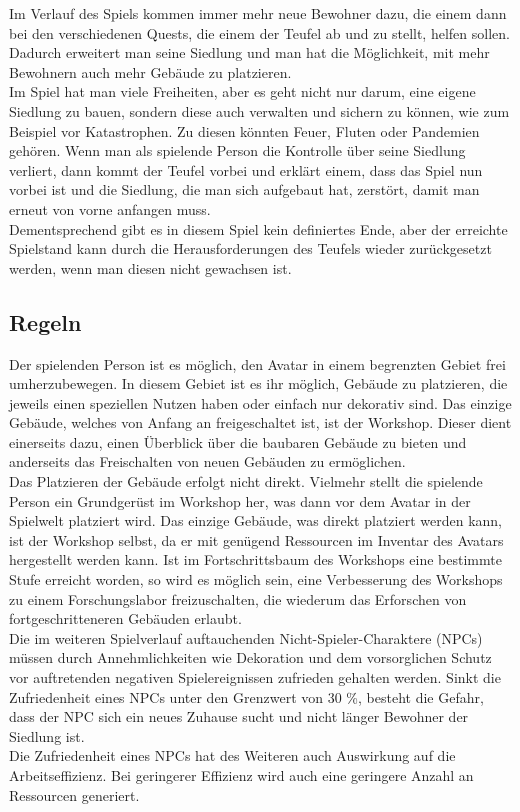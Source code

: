 \documentclass[paper=A4,pagesize=auto,12pt,headinclude=true,footinclude=true,BCOR=0mm,DIV=calc]{scrartcl}
\newcommand{\sectionspace}{
	\vspace{0.5cm}
}
\begin{document}
Im Verlauf des Spiels kommen immer mehr neue Bewohner dazu, die einem dann bei den verschiedenen Quests, die einem der Teufel ab und zu stellt, helfen sollen. Dadurch erweitert man seine Siedlung und man hat die Möglichkeit, mit mehr Bewohnern auch mehr Gebäude zu platzieren. \\
Im Spiel hat man viele Freiheiten, aber es geht nicht nur darum, eine eigene Siedlung zu bauen, sondern diese auch verwalten und sichern zu können, wie zum Beispiel vor Katastrophen. Zu diesen könnten Feuer, Fluten oder Pandemien gehören. Wenn man als spielende Person die Kontrolle über seine Siedlung verliert, dann kommt der Teufel vorbei und erklärt einem, dass das Spiel nun vorbei ist und die Siedlung, die man sich aufgebaut hat, zerstört, damit man erneut von vorne anfangen muss. \\
Dementsprechend gibt es in diesem Spiel kein definiertes Ende, aber der erreichte Spielstand kann durch die Herausforderungen des Teufels wieder zurückgesetzt werden, wenn man diesen nicht gewachsen ist. %


\sectionspace
\subsection{Regeln}
Der spielenden Person ist es möglich, den Avatar in einem begrenzten Gebiet frei umherzubewegen. In diesem Gebiet ist es ihr möglich, Gebäude zu platzieren, die jeweils einen speziellen Nutzen haben oder einfach nur dekorativ sind. Das einzige Gebäude, welches von Anfang an freigeschaltet ist, ist der Workshop. Dieser dient einerseits dazu, einen Überblick über die baubaren Gebäude zu bieten und anderseits das Freischalten von neuen Gebäuden zu ermöglichen. \\
Das Platzieren der Gebäude erfolgt nicht direkt. Vielmehr stellt die spielende Person ein Grundgerüst im Workshop her, was dann vor dem Avatar in der Spielwelt platziert wird. Das einzige Gebäude, was direkt platziert werden kann, ist der Workshop selbst, da er mit genügend Ressourcen im Inventar des Avatars hergestellt werden kann.
Ist im Fortschrittsbaum des Workshops eine bestimmte Stufe erreicht worden, so wird es möglich sein, eine Verbesserung des Workshops zu einem Forschungslabor freizuschalten, die wiederum das Erforschen von fortgeschritteneren Gebäuden erlaubt. \\
Die im weiteren Spielverlauf auftauchenden Nicht-Spieler-Charaktere (NPCs) müssen durch Annehmlichkeiten wie Dekoration und dem vorsorglichen Schutz vor auftretenden negativen Spielereignissen zufrieden gehalten werden. Sinkt die Zufriedenheit eines NPCs unter den Grenzwert von 30 \%, besteht die Gefahr, dass der NPC sich ein neues Zuhause sucht und nicht länger Bewohner der Siedlung ist. \\ %
Die Zufriedenheit eines NPCs hat des Weiteren auch Auswirkung auf die Arbeitseffizienz. Bei geringerer Effizienz wird auch eine geringere Anzahl an Ressourcen generiert.
\end{document}
